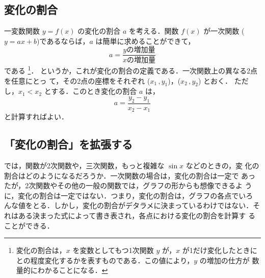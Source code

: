             \subsection{変化の割合}
            一変数関数 $y=f(x)$ の変化の割合 $a$ を考える．関数 $f(x)$ が一次関数
            ($y=ax+b$)であるならば，$a$ は簡単に求めることができて，
            \begin{equation*}
                a=\frac{y\mbox{の増加量}}{x\mbox{の増加量}}
            \end{equation*}
            である
                \footnote{
                    変化の割合は，$x$ を変数としてもつ1次関数 $y$ が，$x$ が1だけ変化したときに
                    との程度変化するかを表すものである．この値により，$y$ の増加の仕方が
                    数量的にわかることになる．
                }．
            というか，これが変化の割合の定義である．一次関数上の異なる2点を任意にとっ
            て，その2点の座標をそれぞれ ($x_{1}\,,y_{1}$)，($x_{2}\,,y_{2}$) とおく．
            ただし，$x_{1} < x_{2}$ とする．このとき変化の割合 $a$ は，
                \begin{equation*}
                    a = \frac{y_{2} - y_{1}}{x_{2} - x_{1}}
                \end{equation*}
            と計算すればよい．

            \subsection{「変化の割合」を拡張する}
            では，関数が2次関数や，三次関数，もっと複雑な $\sin x$ などのときの，変
            化の割合はどのようになるだろうか．一次関数の場合は，変化の割合は一定で
            あったが，2次関数やその他の一般の関数では，グラフの形からも想像できるよ
            うに，変化の割合は一定ではない．つまり，変化の割合は，グラフの各点でいろ
            んな値をとる．しかし，変化の割合がデタラメに決まっているわけではない．そ
            れはある決まった式によって書き表され，各点における変化の割合を計算す
            ることができる．

